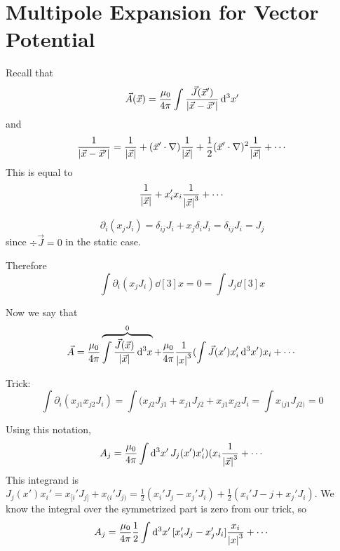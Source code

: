 \documentclass[a4paper,twoside,master.tex]{subfiles}
\begin{document}


\section{Multipole Expansion for Vector Potential}
\label{sec:multipole_expansion_for_vector_potential}

Recall that
\begin{equation}
    \vec{A}( \vec{x} ) = \frac{\mu_0}{4 \pi} \int \frac{ \vec{J} ( \vec{x}' )}{\abs{ \vec{x} - \vec{x}'}} \dd[3]{x'}
\end{equation}
and
\begin{equation}
    \frac{1}{\abs{ \vec{x} - \vec{x}'}} = \frac{1}{\abs{ \vec{x}}} + ( \vec{x}' \cdot \nabla) \frac{1}{\abs{ \vec{x}}} + \frac{1}{2} ( \vec{x}' \cdot \nabla)^2 \frac{1}{\abs{ \vec{x}}} + \cdots
\end{equation}
This is equal to
\begin{equation}
    \frac{1}{\abs{ \vec{x}}} + x_i' x_i \frac{1}{\abs{ \vec{x}}^3} + \cdots
\end{equation}

\begin{equation}
    \partial_i (x_j J_i) = \delta_{ij} J_i + x_j\delta_i J_i = \delta_{ij} J_i = J_j
\end{equation} since $ \div{ \vec{J}} = 0 $ in the static case.

Therefore
\begin{equation}
    \int \partial_i (x_j J_i) \dd[3]{x} = 0 = \int J_j \dd[3]{x}
\end{equation}

Now we say that
\begin{equation}
    \vec{A} = \frac{\mu_0}{4 \pi} \overbrace{ \int \frac{ \vec{J}( \vec{x} )}{\abs{ \vec{x}}}  \dd[3]{x}}^{0} + \frac{\mu_0}{4 \pi} \frac{1}{\abs{x}^3}( \int \vec{J}(x') x_i' \dd[3]{x'})x_i + \cdots
\end{equation}

Trick:
\begin{equation}
    \int \partial_i(x_{j1}x_{j2} J_i) = \int (x_{j2}J_{j1} + x_{j1} J_{j2} + x_{j1}x_{j2}J_i = \int x_{(j1} J_{j2)} = 0
\end{equation}

Using this notation,
\begin{equation}
A_j = \frac{\mu_0}{4 \pi} \int \dd[3]{x'} J_j(x') x_i')(x_i \frac{1}{\abs{ \vec{x}}^3}+\cdots
\end{equation}
This integrand is $ J_j(x')x_i' = x_{[i}'J_{j]} + x_{(i}'J_{j)} = \frac{1}{2}(x_i'J_j - x_j'J_i) + \frac{1}{2} (x_i'J-j + x_j'J_i) $. We know the integral over the symmetrized part is zero from our trick, so
\begin{equation}
    A_j = \frac{\mu_0}{4 \pi} \frac{1}{2} \int \dd[3]{x'} [x_i' J_j - x_j' J_i] \frac{x_i}{\abs{x}^3} +\cdots
\end{equation}
\end{document}
